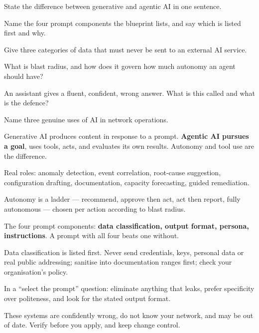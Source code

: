 \begin{checkpoint}
\begin{tightnum}
  \item State the difference between generative and agentic AI in one sentence.
  \item Name the four prompt components the blueprint lists, and say which is
        listed first and why.
  \item Give three categories of data that must never be sent to an external AI
        service.
  \item What is blast radius, and how does it govern how much autonomy an agent
        should have?
  \item An assistant gives a fluent, confident, wrong answer. What is this called
        and what is the defence?
  \item Name three genuine uses of AI in network operations.
\end{tightnum}
\end{checkpoint}

\begin{chaptersummary}
\begin{tight}
  \item Generative AI produces content in response to a prompt. \textbf{Agentic
        AI pursues a goal}, uses tools, acts, and evaluates its own results.
        Autonomy and tool use are the difference.
  \item Real roles: anomaly detection, event correlation, root-cause suggestion,
        configuration drafting, documentation, capacity forecasting, guided
        remediation.
  \item Autonomy is a ladder --- recommend, approve then act, act then report,
        fully autonomous --- chosen per action according to blast radius.
  \item The four prompt components: \textbf{data classification, output format,
        persona, instructions}. A prompt with all four beats one without.
  \item Data classification is listed first. Never send credentials, keys,
        personal data or real public addressing; sanitise into documentation
        ranges first; check your organisation's policy.
  \item In a ``select the prompt'' question: eliminate anything that leaks, prefer
        specificity over politeness, and look for the stated output format.
  \item These systems are confidently wrong, do not know your network, and may be
        out of date. Verify before you apply, and keep change control.
\end{tight}
\end{chaptersummary}

